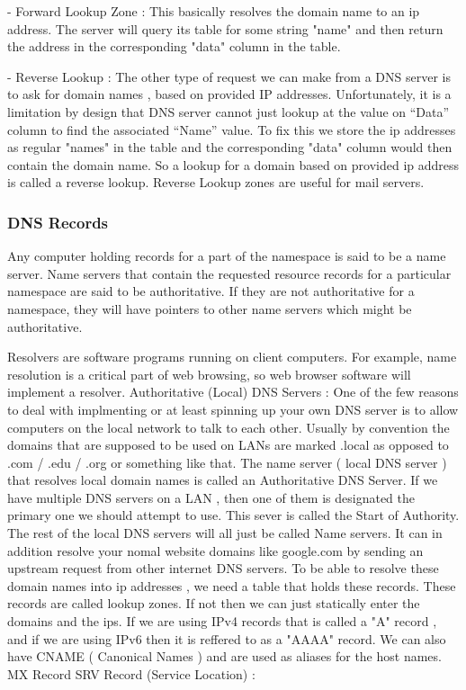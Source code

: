 - Forward Lookup Zone : This basically resolves the domain name to an ip
address. The server will query its table for some string "name" and then return
the address in the corresponding "data" column in the table.

 - Reverse Lookup : The other type of request we can make from a DNS server is
 to ask for domain names , based on provided IP addresses.  Unfortunately, it is
 a limitation by design that DNS server cannot just lookup at the value on
 “Data” column to find the associated “Name” value. To fix this we store the ip
 addresses as regular "names" in the table and the corresponding "data" column
 would then contain the domain name. So a lookup for a domain based on provided
 ip address is called a reverse lookup.  Reverse Lookup zones are useful for
 mail servers.

\subsubsectionend

\subsubsection{DNS Records}
\label{sssec:dns_records}

Any computer holding records for a part of the namespace is said to be a name
server. Name servers that contain the requested resource records for a
particular namespace are said to be authoritative. If they are not authoritative
for a namespace, they will have pointers to other name servers which might be
authoritative.

Resolvers are software programs running on client computers. For example, name
resolution is a critical part of web browsing, so web browser software will
implement a resolver.
Authoritative (Local) DNS Servers : One of the few reasons to deal with
implmenting or at least spinning up your own DNS server is to allow computers on
the local network to talk to each other. Usually by convention the domains that
are supposed to be used on LANs are marked .local as opposed to .com / .edu /
.org or something like that. The name server ( local DNS server ) that resolves
local domain names is called an Authoritative DNS Server. If we have multiple
DNS servers on a LAN , then one of them is designated the primary one we should
attempt to use. This sever is called the Start of Authority. The rest of the
local DNS servers will all just be called Name servers. It can in addition
resolve your nomal website domains like google.com by sending an upstream
request from other internet DNS servers.  To be able to resolve these domain
names into ip addresses , we need a table that holds these records. These
records are called lookup zones.  If not then we can just statically enter the
domains and the ips. If we are using IPv4 records that is called a "A" record ,
and if we are using IPv6 then it is reffered to as a "AAAA" record. We can also
have CNAME ( Canonical Names ) and are used as aliases for the host names.
MX Record
SRV Record (Service Location) : 

